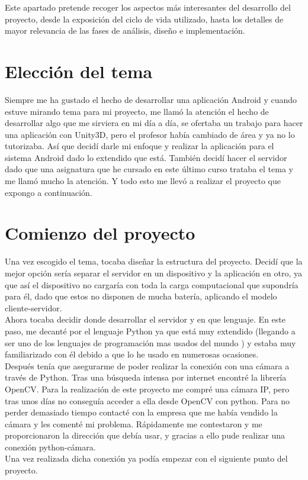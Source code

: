 
Este apartado pretende recoger los aspectos más interesantes del desarrollo del proyecto, desde la exposición del ciclo de vida utilizado, hasta los detalles de mayor relevancia de las fases de análisis, diseño e implementación.

\section{Elección del tema}

Siempre me ha gustado el hecho de desarrollar una aplicación Android y cuando estuve mirando tema para mi proyecto, me llamó la atención el hecho de desarrollar algo que me sirviera en mi día a día, se ofertaba un trabajo para hacer una aplicación con Unity3D, pero el profesor había cambiado de área y ya no lo tutorizaba. 
Así que decidí darle mi enfoque y realizar la aplicación para el sistema Android dado lo extendido que está. 
También decidí hacer el servidor dado que una asignatura que he cursado en este último curso trataba el tema y me llamó mucho la atención. Y todo esto me llevó a realizar el proyecto que expongo a continuación.



\section{Comienzo del proyecto}

Una vez escogido el tema, tocaba diseñar la estructura del proyecto. 
Decidí que la mejor opción sería separar el servidor en un dispositivo y la aplicación en otro, ya que así el dispositivo no cargaría con toda la carga computacional que supondría para él, dado que estos no disponen de mucha batería, aplicando el modelo cliente-servidor.\\
Ahora tocaba decidir donde desarrollar el servidor y en que lenguaje. En este paso, me decanté por el lenguaje Python ya que está muy extendido (llegando a ser uno de los lenguajes de programación mas usados del mundo \cite{pythonuse}) y estaba muy familiarizado con él debido a que lo he usado en numerosas ocasiones.\\
Después tenía que asegurarme de poder realizar la conexión con una cámara a través de Python.
Tras una búsqueda intensa por internet encontré la librería OpenCV. 
Para la realización de este proyecto me compré una cámara IP, pero tras unos días no conseguía acceder a ella desde OpenCV con python. 
Para no perder demasiado tiempo contacté con la empresa que me había vendido la cámara y les comenté mi problema.
Rápidamente me contestaron y me proporcionaron la dirección que debía usar, y gracias a ello pude realizar una conexión python-cámara.\\
Una vez realizada dicha conexión ya podía empezar con el siguiente punto del proyecto.



